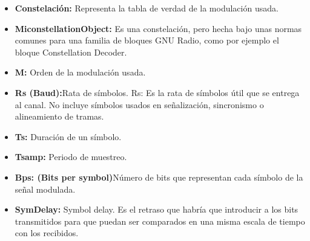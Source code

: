 \begin{itemize}
	\item  \textbf{Constelación:} Representa la tabla de verdad de la modulación usada.
	\item  \textbf{MiconstellationObject:} Es una constelación, pero hecha bajo unas normas comunes para una familia de bloques GNU Radio, como por ejemplo el bloque Constellation Decoder.
	\item  \textbf{M:} Orden de la modulación usada.
	\item  \textbf{Rs (Baud):}Rata de símbolos. Rs: Es la rata de símbolos útil que se entrega al canal. No incluye símbolos usados en señalización, sincronismo o alineamiento de tramas.
	\item  \textbf{Ts:} Duración de un símbolo.
	\item  \textbf{Tsamp:} Periodo de muestreo.
	\item  \textbf{Bps: (Bits per symbol)}Número de bits que representan cada símbolo de la señal modulada.
	\item  \textbf{SymDelay:} Symbol delay. Es el retraso que habría que introducir a los bits transmitidos para que puedan ser comparados en una misma escala de tiempo con los recibidos.

\end{itemize}

